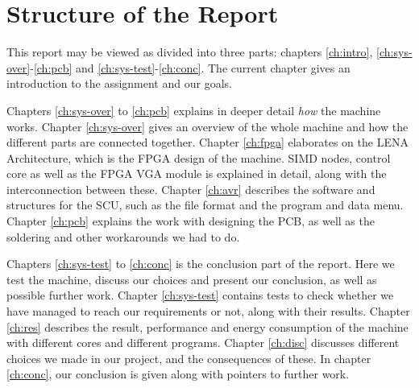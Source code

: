 \section{Structure of the Report}

This report may be viewed as divided into three parts: chapters
\ref{ch:intro}, \ref{ch:sys-over}-\ref{ch:pcb} and
\ref{ch:sys-test}-\ref{ch:conc}. The
current chapter gives an introduction to the assignment and our goals.

Chapters \ref{ch:sys-over} to \ref{ch:pcb} explains in deeper detail {\em how}
the machine works. Chapter \ref{ch:sys-over} gives an overview of the whole
machine and how the different parts are connected together. Chapter
\ref{ch:fpga} elaborates on the \ac{LENA} Architecture, which is the \ac{FPGA}
design of the machine. \ac{SIMD} nodes, control core as well as the \ac{FPGA}
\ac{VGA} module is explained in detail, along with the interconnection between
these. Chapter \ref{ch:avr} describes the software and structures for the \ac{SCU},
such as the file format and the program and data menu. Chapter \ref{ch:pcb}
explains the work with designing the \ac{PCB}, as well as the soldering and
other workarounds we had to do.

Chapters \ref{ch:sys-test} to \ref{ch:conc} is the conclusion part of the
report. Here we test the machine, discuss our choices and present our
conclusion, as well as possible further work. Chapter \ref{ch:sys-test} contains
tests to check whether we have managed to reach our requirements or not, along
with their results. Chapter \ref{ch:res} describes the result, performance and
energy consumption of the machine with different cores and different
programs. Chapter \ref{ch:disc} discusses different choices we made in our
project, and the consequences of these. In chapter \ref{ch:conc}, our conclusion is
given along with pointers to further work.
